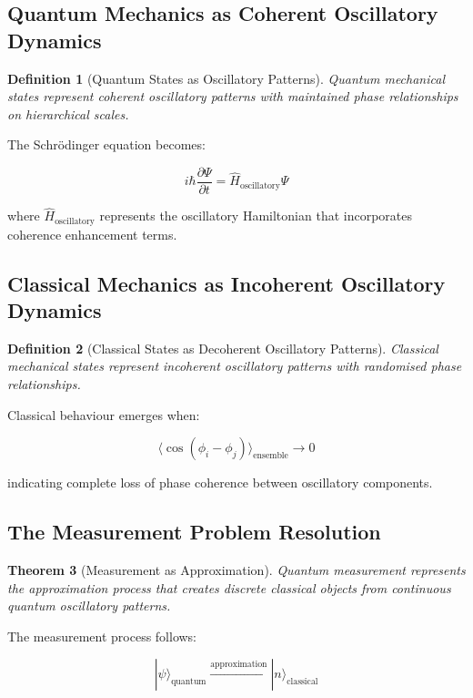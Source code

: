 \documentclass[11pt]{article}
\newtheorem{theorem}{Theorem}[section]
\newtheorem{definition}[theorem]{Definition}
\theoremstyle{remark}
\begin{document}
\subsection{Quantum Mechanics as Coherent Oscillatory Dynamics}

\begin{definition}[Quantum States as Oscillatory Patterns]
Quantum mechanical states represent coherent oscillatory patterns with maintained phase relationships on hierarchical scales.
\end{definition}

The Schrödinger equation becomes:

$$i\hbar \frac{\partial \Psi}{\partial t} = \hat{H}_{\text{oscillatory}} \Psi$$

where $\hat{H}_{\text{oscillatory}}$ represents the oscillatory Hamiltonian that incorporates coherence enhancement terms.

\subsection{Classical Mechanics as Incoherent Oscillatory Dynamics}

\begin{definition}[Classical States as Decoherent Oscillatory Patterns]
Classical mechanical states represent incoherent oscillatory patterns with randomised phase relationships.
\end{definition}

Classical behaviour emerges when:

$$\langle \cos(\phi_i - \phi_j) \rangle_{\text{ensemble}} \to 0$$

indicating complete loss of phase coherence between oscillatory components.

\subsection{The Measurement Problem Resolution}

\begin{theorem}[Measurement as Approximation]
Quantum measurement represents the approximation process that creates discrete classical objects from continuous quantum oscillatory patterns.
\end{theorem}

The measurement process follows:

$$|\psi\rangle_{\text{quantum}} \xrightarrow{\text{approximation}} |n\rangle_{\text{classical}}$$
\end{document}
